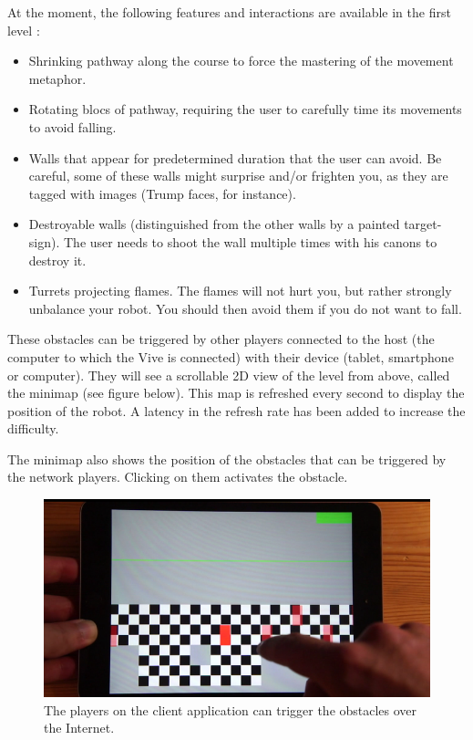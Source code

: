 \documentclass[12pt]{article}
\begin{document}
At the moment, the following features and interactions are available in the first level :

\begin{itemize}
	\item Shrinking pathway along the course to force the mastering of the movement metaphor.
	\item Rotating blocs of pathway, requiring the user to carefully time its movements to avoid falling.
	\item Walls that appear for predetermined duration that the user can avoid. Be careful, some of these walls might surprise and/or frighten you, as they are tagged with images (Trump faces, for instance).
	\item Destroyable walls (distinguished from the other walls by a painted target-sign). The user needs to shoot the wall multiple times with his canons to destroy it.
	\item Turrets projecting flames. The flames will not hurt you, but rather strongly unbalance your robot. You should then avoid them if you do not want to fall.
\end{itemize}

These obstacles can be triggered by other players connected to the host (the computer to which the Vive is connected) with their device (tablet, smartphone or computer). They will see a scrollable 2D view of the level from above, called the minimap (see figure below). This map is refreshed every second to display the position of the robot. A latency in the refresh rate has been added to increase the difficulty.

The minimap also shows the position of the obstacles that can be triggered by the network players. Clicking on them activates the obstacle.

\begin{figure}[h]
   \caption{\label{étiquette} The players on the client application can trigger the obstacles over the Internet.}
   \includegraphics[scale=0.7]{images/minimap.png}
\end{figure}
\end{document}
